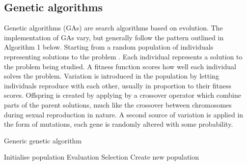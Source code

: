 \subsection{Genetic algorithms}
\newline
{}
\newline
Genetic algorithms (GAs) are search algorithms based on evolution. The implementation of GAs vary, but
generally follow the pattern outlined in Algorithm 1 below. Starting from a random population of individuals
representing solutions to the problem . Each individual represents a solution to the problem being
studied. A fitness function scores how well each individual solves the problem. Variation is introduced
in the population by letting individuals reproduce with each other, usually in proportion to their fitness
scores. Offspring is created by applying by a crossover operator which combine parts of the parent solutions,
much like the crossover between chromosomes during sexual reproduction in nature. A second source of variation
is applied in the form of mutations, each gene is randomly altered with some probability.


\begin{algorithm}[H]
    \caption{Generic genetic algorithm}
    \begin{algorithmic}

    \State Initialise population
        \State Evaluation 
        \State Selection  
        \State Create new population 
    \EndWhile
\EndProcedure

\end{algorithmic}
\end{algorithm}

